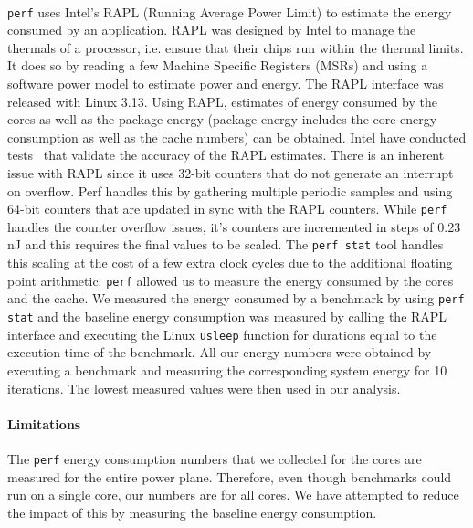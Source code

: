 \paragraph{}\texttt{perf} uses Intel's RAPL (Running Average Power Limit) to estimate the energy consumed by an application. 
RAPL was designed by Intel to manage the thermals of a processor, i.e. ensure that their chips run within the thermal limits. It does so by reading a 
few Machine Specific Registers (MSRs) and using a software power model to estimate power and energy. The RAPL interface 
was released with Linux 3.13. Using RAPL, estimates of energy consumed by the cores as well as the package energy 
(package energy includes the core energy consumption as well as the cache numbers) can be obtained. Intel have 
conducted tests~\cite{rotem2012power} that validate the accuracy of the RAPL estimates.
There is an inherent issue with RAPL since it uses 32-bit counters that do not generate an interrupt on overflow. 
Perf handles this by gathering multiple periodic samples and using 64-bit counters that are updated in sync with 
the RAPL counters. While \texttt{perf} handles the counter overflow issues, it’s counters are incremented in steps of 0.23 nJ 
and this requires the final values to be scaled. The \texttt{perf stat} tool handles this scaling at the cost of a few extra 
clock cycles due to the additional floating point arithmetic. \texttt{perf} allowed us to measure the energy consumed by the cores and the cache.
We measured the energy consumed by a benchmark by using \texttt{perf stat} and the baseline energy consumption was measured 
by calling the RAPL interface and executing the Linux \texttt{usleep} function for durations equal to the execution time 
of the benchmark. All our energy numbers were obtained by executing a benchmark and measuring the corresponding 
system energy for 10 iterations. The lowest measured values were then used in our analysis.


\paragraph{Limitations}
 The \texttt{perf} energy consumption numbers that we collected for the cores are measured for the entire power plane. 
Therefore, even though benchmarks could run on a single core, our numbers are for all cores. We have attempted to 
reduce the impact of this by measuring the baseline energy consumption.
  
